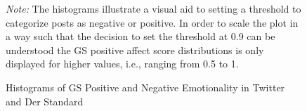 \documentclass[
  english,
  jou,floatsintext]{apa7}
\begin{document}
\clearpage

\renewcommand{\thefigure}{A\arabic{figure}}
\renewcommand{\thetable}{A\arabic{table}}
\setcounter{figure}{0}
\setcounter{table}{0}

\begin{figure}
\caption{ Histograms of GS Positive and Negative Emotionality in Twitter and Der Standard \label{fig:hist-plot}}

\newline{}

\textit{Note:} The histograms illustrate a visual aid to setting a threshold to categorize posts as negative or positive. In order to scale the plot in a way such that the decision to set the threshold at 0.9 can be understood the GS positive affect score distributions is only displayed for higher values, i.e., ranging from 0.5 to 1.
\end{figure}
\end{document}
